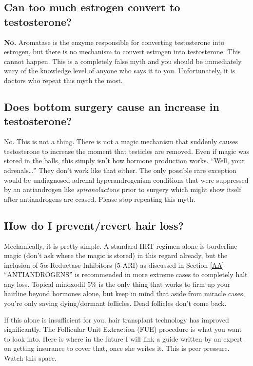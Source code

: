 \documentclass{article}
\begin{document}
\subsection{Can too much estrogen convert to testosterone?}

\textbf{No.} Aromatase is the enzyme responsible for converting testosterone into estrogen, but there is no mechanism to convert estrogen into testosterone. This cannot happen. This is a completely false myth and you should be immediately wary of the knowledge level of anyone who says it to you. Unfortunately, it is doctors who repeat this myth the most.

\subsection{Does bottom surgery cause an increase in testosterone?}

No. This is not a thing. There is not a magic mechanism that suddenly causes testosterone to increase the moment that testicles are removed. Even if magic was stored in the balls, this simply isn’t how hormone production works. “Well, your adrenals…” They don’t work like that either. The only possible rare exception would be undiagnosed adrenal hyperandrogenism conditions that were suppressed by an antiandrogen like \textit{spironolactone }prior to surgery which might show itself after antiandrogens are ceased. Please stop repeating this myth.

\subsection{How do I prevent/revert hair loss?}\label{11-14}

Mechanically, it is pretty simple. A standard HRT regimen alone is borderline magic (don’t ask where the magic is stored) in this regard already, but the inclusion of 5$\alpha$-Reductase Inhibitors (5-ARI) as discussed in Section \ref{AA} “ANTIANDROGENS” is recommended in more extreme cases to completely halt any loss. Topical minoxodil 5\% is the only thing that works to firm up your hairline beyond hormones alone, but keep in mind that aside from miracle cases, you’re only saving dying/dormant follicles. Dead follicles don’t come back.

If this alone is insufficient for you, hair transplant technology has improved significantly. The Follicular Unit Extraction (FUE) procedure is what you want to look into. Here is where in the future I will link a guide written by an expert on getting insurance to cover that, once she writes it. This is peer pressure. Watch this space.
\end{document}
